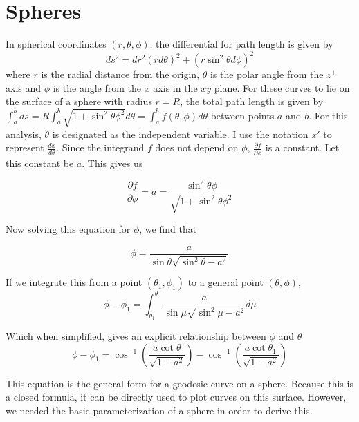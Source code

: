 \documentclass{article}
\begin{document}
\section{Spheres}
In spherical coordinates $(r, \theta, \phi)$, the differential for path length is given by
\begin{equation}
ds^2 = dr^2 (r d \theta)^2 + ( r \sin^2\theta d\phi)^2
\end{equation}
where $r$ is the radial distance from the origin, $\theta$ is the polar angle from the $z^+$ axis and $\phi$ is the angle from the $x$ axis in the $xy$ plane. For these curves to lie on the surface of a sphere with radius $r=R$, the total path length is given by $\int_a^b ds = R\int_a^b \sqrt{1+\sin^2\theta \phi^2} d\theta = \int_a^b f(\theta, \phi)d\theta$ between points $a$ and $b$. For this analysis, $\theta$ is designated as the independent variable. I use the notation $x'$ to represent $\frac{dx}{d\theta}$. Since the integrand $f$ does not depend on $\phi$, $\frac{\partial f}{\partial \phi}$ is a constant. Let this constant be $a$. This gives us

\begin{equation}
    \frac{\partial f}{\partial \phi} = a = \frac{\sin^2\theta \phi}{\sqrt{1+\sin^2\theta \phi^2}}
\end{equation}

Now solving this equation for $\phi$, we find that

\begin{equation}
    \phi = \frac{a}{\sin\theta \sqrt{\sin^2 \theta - a^2}}
\end{equation}

If we integrate this from a point $(\theta_1, \phi_1)$ to a general point $(\theta, \phi)$,
\begin{equation}
    \phi-\phi_1 = \int_{\theta_1}^{\theta} \frac{a}{\sin\mu \sqrt{\sin^2 \mu - a^2}} d\mu
\end{equation}

Which when simplified, gives an explicit relationship between $\phi$ and $\theta$
\begin{equation}
    \phi - \phi_1 = \cos^{-1}(\frac{a\cot \theta}{\sqrt{1-a^2}})-\cos^{-1}(\frac{a\cot \theta_1}{\sqrt{1-a^2}})
\end{equation}

This equation is the general form for a geodesic curve on a sphere. Because this is a closed formula, it can be directly used to plot curves on this surface. However, we needed the basic parameterization of a sphere in order to derive this.
\end{document}

